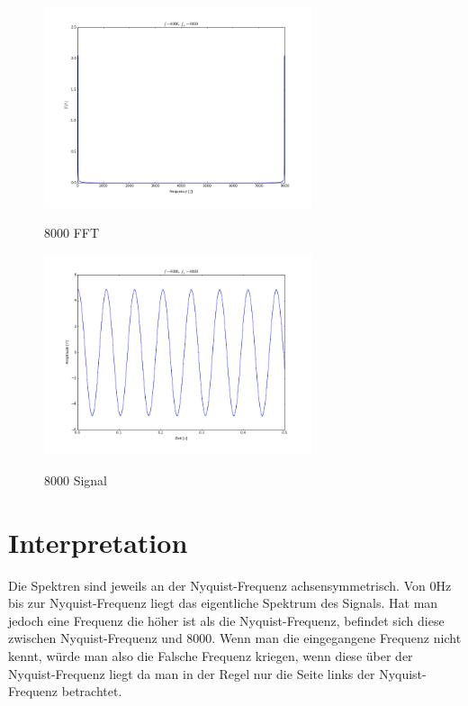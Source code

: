 \documentclass[TGAI_Laborbericht.tex]{subfiles}
\begin{document}
\begin{figure}[H]
	\includegraphics[width=0.7\textwidth]{media/8000-fft.png}
	\label{Hoch}
	\caption{8000 FFT}
\end{figure}

\begin{figure}[H]
	\includegraphics[width=0.7\textwidth]{media/8000-signal.png}
	\label{Hoch}
	\caption{8000 Signal}
\end{figure}
\section{Interpretation}
\label{chap:VERSUCH_4_INTERPRETATION}
Die Spektren sind jeweils an der Nyquist-Frequenz achsensymmetrisch. Von 0Hz bis zur Nyquist-Frequenz liegt das eigentliche Spektrum des Signals. Hat man jedoch eine Frequenz die höher ist als die Nyquist-Frequenz, befindet sich diese zwischen Nyquist-Frequenz und 8000. Wenn man die eingegangene Frequenz nicht kennt, würde man also die Falsche Frequenz kriegen, wenn diese über der Nyquist-Frequenz liegt da man in der Regel nur die Seite links der Nyquist-Frequenz betrachtet.
\end{document}
